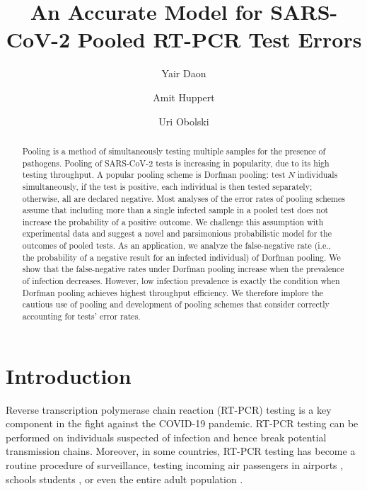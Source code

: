 \documentclass{article}
\begin{document}
\title{An Accurate Model for SARS-CoV-2 Pooled RT-PCR Test Errors}

\author[1,2]{Yair Daon}
\author[1,3,*]{Amit Huppert}
\author[1,2,*]{Uri Obolski}





\date{}

\maketitle

\begin{abstract}
Pooling is a method of simultaneously testing multiple samples for the
presence of pathogens. Pooling of SARS-CoV-2 tests is increasing in
popularity, due to its high testing throughput. A popular pooling
scheme is Dorfman pooling: test $N$ individuals simultaneously, if the
test is positive, each individual is then tested separately;
otherwise, all are declared negative. Most analyses of the error rates
of pooling schemes assume that including more than a single infected
sample in a pooled test does not increase the probability of a
positive outcome. We challenge this assumption with experimental data
and suggest a novel and parsimonious probabilistic model for the
outcomes of pooled tests. As an application, we analyze the
false-negative rate (i.e., the probability of a negative result for an
infected individual) of Dorfman pooling. We show that the
false-negative rates under Dorfman pooling increase when the
prevalence of infection decreases. However, low infection prevalence
is exactly the condition when Dorfman pooling achieves highest
throughput efficiency. We therefore implore the cautious use of
pooling and development of pooling schemes that consider correctly
accounting for tests' error rates.
\end{abstract}
\newpage

\section*{Introduction}
Reverse transcription polymerase chain reaction (RT-PCR) testing is a
key component in the fight against the COVID-19 pandemic. RT-PCR
testing can be performed on individuals suspected of infection and
hence break potential transmission chains. Moreover, in some
countries, RT-PCR testing has become a routine procedure of
surveillance, testing incoming air passengers in airports
\cite{PoolingAirports, TestingAirportsJapan}, schools students
\cite{PoolSchool}, or even the entire adult population
\cite{MassPooling}.
\end{document}
